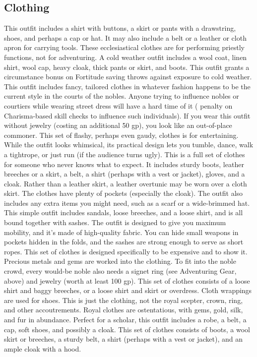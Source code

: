 \subsection{Clothing}
 This outfit includes a shirt with buttons, a skirt or pants with a drawstring, shoes, and perhaps a cap or hat. It may also include a belt or a leather or cloth apron for carrying tools.
 These ecclesiastical clothes are for performing priestly functions, not for adventuring.
 A cold weather outfit includes a wool coat, linen shirt, wool cap, heavy cloak, thick pants or skirt, and
boots. This outfit grants a  circumstance bonus on Fortitude saving throws against exposure to cold weather.
 This outfit includes fancy, tailored clothes in whatever fashion happens to be the current style in the courts of the nobles. Anyone trying to influence nobles or courtiers while wearing street dress will have a hard time of it ( penalty on Charisma-based skill checks to influence such individuals). If you wear this outfit without jewelry (costing an additional 50 gp), you look like an out-of-place commoner.
 This set of flashy, perhaps even gaudy, clothes is for entertaining. While the outfit looks whimsical, its practical design lets you tumble, dance, walk a tightrope, or just run (if the audience turns ugly).
 This is a full set of clothes for someone who never knows what to expect. It includes sturdy boots, leather breeches or a skirt, a belt, a shirt (perhaps with a vest or jacket), gloves, and a cloak. Rather than a leather skirt, a leather overtunic may be worn over a cloth skirt. The clothes have plenty of pockets (especially the cloak). The outfit also includes any extra items you might need, such as a scarf or a wide-brimmed hat.
 This simple outfit includes sandals, loose breeches, and a loose shirt, and is all bound together with sashes. The outfit is designed to give you maximum mobility, and it's made of high-quality fabric. You can hide small weapons in pockets hidden in the folds, and the sashes are strong enough to serve as short ropes.
 This set of clothes is designed specifically to be expensive and to show it. Precious metals and gems are worked into the clothing. To fit into the noble crowd, every would-be noble also needs a signet ring (see Adventuring Gear, above) and jewelry (worth at least 100 gp).
 This set of clothes consists of a loose shirt and baggy breeches, or a loose shirt and skirt or overdress. Cloth wrappings are used for shoes.
 This is just the clothing, not the royal scepter, crown, ring, and other accoutrements. Royal clothes are ostentatious, with gems, gold, silk, and fur in abundance.
 Perfect for a scholar, this outfit includes a robe, a belt, a cap, soft shoes, and possibly a cloak.
 This set of clothes consists of boots, a wool skirt or breeches, a sturdy belt, a shirt (perhaps with a vest or jacket), and an ample cloak with a hood.

